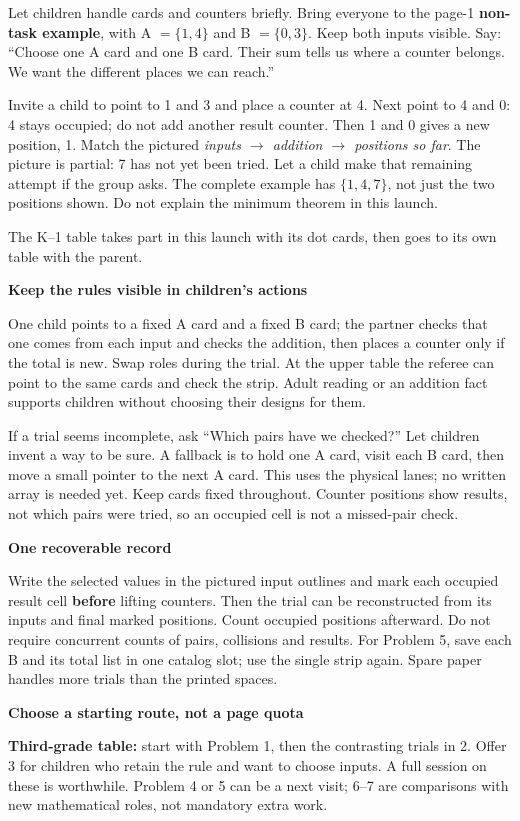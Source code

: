 \documentclass[11pt]{article}
\newcommand{\heading}[1]{\vspace{4pt}{\large\bfseries #1}\par}
\newcommand{\sub}[1]{\textbf{#1}\par}
\newcommand{\sset}[1]{\{#1\}}
\begin{document}
\heading{Launch, then let the concrete problem carry the work}
Let children handle cards and counters briefly. Bring everyone to the page-1 \textbf{non-task example}, with A $=\sset{1,4}$ and B $=\sset{0,3}$. Keep both inputs visible. Say: ``Choose one A card and one B card. Their sum tells us where a counter belongs. We want the different places we can reach.''

Invite a child to point to 1 and 3 and place a counter at 4. Next point to 4 and 0: 4 stays occupied; do not add another result counter. Then 1 and 0 gives a new position, 1. Match the pictured \emph{inputs $\to$ addition $\to$ positions so far}. The picture is partial: 7 has not yet been tried. Let a child make that remaining attempt if the group asks. The complete example has $\sset{1,4,7}$, not just the two positions shown. Do not explain the minimum theorem in this launch.

The K--1 table takes part in this launch with its dot cards, then goes to its own table with the parent.

\sub{Keep the rules visible in children's actions}
One child points to a fixed A card and a fixed B card; the partner checks that one comes from each input and checks the addition, then places a counter only if the total is new. Swap roles during the trial. At the upper table the referee can point to the same cards and check the strip. Adult reading or an addition fact supports children without choosing their designs for them.

If a trial seems incomplete, ask ``Which pairs have we checked?'' Let children invent a way to be sure. A fallback is to hold one A card, visit each B card, then move a small pointer to the next A card. This uses the physical lanes; no written array is needed yet. Keep cards fixed throughout. Counter positions show results, not which pairs were tried, so an occupied cell is not a missed-pair check.

\sub{One recoverable record}
Write the selected values in the pictured input outlines and mark each occupied result cell \textbf{before} lifting counters. Then the trial can be reconstructed from its inputs and final marked positions. Count occupied positions afterward. Do not require concurrent counts of pairs, collisions and results. For Problem 5, save each B and its total list in one catalog slot; use the single strip again. Spare paper handles more trials than the printed spaces.

\sub{Choose a starting route, not a page quota}
\textbf{Third-grade table:} start with Problem 1, then the contrasting trials in 2. Offer 3 for children who retain the rule and want to choose inputs. A full session on these is worthwhile. Problem 4 or 5 can be a next visit; 6--7 are comparisons with new mathematical roles, not mandatory extra work.
\end{document}
